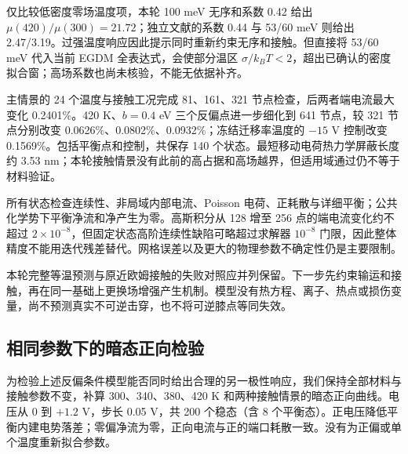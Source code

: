 {\cjkfont 仅比较低密度零场温度项，本轮}\allowbreak{} 100 meV {\cjkfont 无序和系数}\allowbreak{} 0.42 {\cjkfont 给出}\allowbreak{} $\mu(420)/\mu(300)=21.72${\cjkfont ；独立文献的系数}\allowbreak{} 0.44 {\cjkfont 与}\allowbreak{} 53/60 meV {\cjkfont 则给出}\allowbreak{} 2.47/3.19{\cjkfont 。过强温度响应因此提示同时重新约束无序和接触。但直接将}\allowbreak{} 53/60 meV {\cjkfont 代入当前}\allowbreak{} EGDM {\cjkfont 全表达式，会使部分温区}\allowbreak{} $\sigma/k_BT<2${\cjkfont ，超出已确认的密度拟合窗；高场系数也尚未核验，不能无依据补齐。}\allowbreak{}

{\cjkfont 主情景的}\allowbreak{} 24 {\cjkfont 个温度与接触工况完成}\allowbreak{} 81{\cjkfont 、}\allowbreak{}161{\cjkfont 、}\allowbreak{}321 {\cjkfont 节点检查，后两者端电流最大变化}\allowbreak{} 0.2401\%{\cjkfont 。}\allowbreak{}420 K{\cjkfont 、}\allowbreak{}$b=0.4$ eV {\cjkfont 三个反偏点进一步细化到}\allowbreak{} 641 {\cjkfont 节点，较}\allowbreak{} 321 {\cjkfont 节点分别改变}\allowbreak{} 0.0626\%{\cjkfont 、}\allowbreak{}0.0802\%{\cjkfont 、}\allowbreak{}0.0932\%{\cjkfont ；冻结迁移率温度的}\allowbreak{} $-15$ V {\cjkfont 控制改变}\allowbreak{} 0.1569\%{\cjkfont 。包括平衡点和控制，共保存}\allowbreak{} 140 {\cjkfont 个状态。最短移动电荷热力学屏蔽长度约}\allowbreak{} 3.53 nm{\cjkfont ；本轮接触情景没有此前的高占据和高场越界，但适用域通过仍不等于材料验证。}\allowbreak{}

{\cjkfont 所有状态检查连续性、非局域内部电流、}\allowbreak{}Poisson {\cjkfont 电荷、正耗散与详细平衡；公共化学势下平衡净流和净产生为零。高斯积分从}\allowbreak{} 128 {\cjkfont 增至}\allowbreak{} 256 {\cjkfont 点的端电流变化约不超过}\allowbreak{} $2\times10^{-8}${\cjkfont ，但固定状态高阶连续性缺陷可略超过求解器}\allowbreak{} $10^{-8}$ {\cjkfont 门限，因此整体精度不能用迭代残差替代。网格误差以及更大的物理参数不确定性仍是主要限制。}\allowbreak{}

{\cjkfont 本轮完整等温预测与原近欧姆接触的失败对照应并列保留。下一步先约束输运和接触，再在同一基础上更换场增强产生机制。模型没有热方程、离子、热点或损伤变量，尚不预测真实不可逆击穿，也不将可逆膝点等同失效。}\allowbreak{}


\subsection{{\cjkfont 相同参数下的暗态正向检验}\allowbreak{}}
{\cjkfont 为检验上述反偏条件模型能否同时给出合理的另一极性响应，我们保持全部材料与接触参数不变，补算}\allowbreak{} 300{\cjkfont 、}\allowbreak{}340{\cjkfont 、}\allowbreak{}380{\cjkfont 、}\allowbreak{}420 K {\cjkfont 和两种接触情景的暗态正向曲线。电压从}\allowbreak{} 0 {\cjkfont 到}\allowbreak{} $+1.2$ V{\cjkfont ，步长}\allowbreak{} 0.05 V{\cjkfont ，共}\allowbreak{} 200 {\cjkfont 个稳态（含}\allowbreak{} 8 {\cjkfont 个平衡态）。正电压降低平衡内建电势落差；零偏净流为零，正向电流与正的端口耗散一致。没有为正偏或单个温度重新拟合参数。}\allowbreak{}

